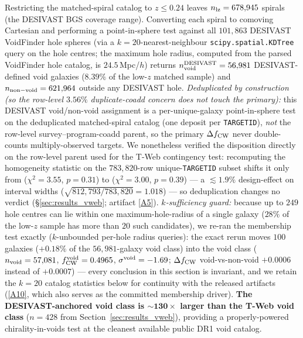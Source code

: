 \documentclass[aps,prd,twocolumn,superscriptaddress,showpacs,preprintnumbers,nofootinbib,longbibliography,floatfix]{revtex4-2}
\newcommand{\repoBase}{https://github.com/Hubify-Projects/bigbounce/blob/main}
\begin{document}
Restricting the matched-spiral catalog to $z \leq 0.24$ leaves
$n_{\rm lz} = 678{,}945$ spirals (the DESIVAST BGS coverage range).
Converting each spiral to comoving Cartesian and performing a
point-in-sphere test against all $101{,}863$ DESIVAST VoidFinder
hole spheres (via a $k = 20$-nearest-neighbour
\texttt{scipy.spatial.KDTree} query on the hole centres; the maximum
hole radius, computed from the parsed VoidFinder hole catalog, is
$24.5\,$Mpc/$h$) returns
$n_{\rm void}^{\rm DESIVAST} = 56{,}981$ DESIVAST-defined void galaxies
($8.39\%$ of the low-$z$ matched sample) and $n_{\rm non-void} =
621{,}964$ outside any DESIVAST hole.
\emph{Deduplicated by construction (so the row-level $3.56\%$ duplicate-coadd concern does not touch the primary):} this DESIVAST void/non-void assignment is a per-unique-galaxy point-in-sphere test on the deduplicated matched-spiral catalog (one deposit per \texttt{TARGETID}), \emph{not} the row-level survey--program-coadd parent, so the primary $\Delta f_{\rm CW}$ never double-counts multiply-observed targets. We nonetheless verified the disposition directly on the row-level parent used for the T-Web contingency test: recomputing the homogeneity statistic on the $783{,}820$-row unique-\texttt{TARGETID} subset shifts it only from ($\chi^2\!=\!3.55$, $p\!=\!0.31$) to ($\chi^2\!=\!3.00$, $p\!=\!0.39$) --- a $\lesssim\!1.9\%$ design-effect on interval widths ($\sqrt{812{,}793/783{,}820}\!=\!1.018$) --- so deduplication changes no verdict (\S\ref{sec:results_vweb}; artifact \href{\repoBase/pipelines/p5\_desi\_chirality/outputs/21\_r23conf\_meta\_closures.json}{[A5]}).
\emph{$k$-sufficiency guard:} because up to $249$ hole centres can lie
within one maximum-hole-radius of a single galaxy ($28\%$ of the
low-$z$ sample has more than $20$ such candidates), we re-ran the
membership test exactly ($k$-unbounded per-hole radius queries):
the exact rerun moves $100$ galaxies ($+0.18\%$ of the
$56{,}981$-galaxy void class) into the void class
($n_{\rm void} = 57{,}081$, $f_{\rm CW}^{\rm void} = 0.4965$,
$\sigma^{\rm void} = -1.69$; $\Delta f_{\rm CW}$ void-vs-non-void
$+0.0006$ instead of $+0.0007$) — every conclusion in this section is
invariant, and we retain the $k=20$ catalog statistics below for
continuity with the released artifacts
(\href{\repoBase/pipelines/p5\_desi\_chirality/outputs/17\_v0151\_closure\_recomputes.json}{[A10]},
which also serves as the committed membership driver). \textbf{The DESIVAST-anchored
void class is $\boldsymbol{\sim\!130\times}$ larger than the T-Web void
class} ($n = 428$ from Section~\ref{sec:results_vweb}), providing a
properly-powered chirality-in-voids test at the cleanest available
public DR1 void catalog.
\end{document}
